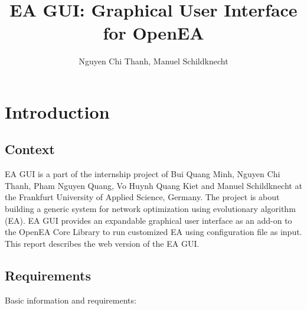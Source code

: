 \documentclass[11pt,a4paper]{article}
\author{Nguyen Chi Thanh, Manuel Schildknecht}
\title{EA GUI: Graphical User Interface for OpenEA}
\begin{document}
\maketitle

\section{Introduction}
\subsection{Context}
EA GUI is a part of the internship project of Bui Quang Minh, Nguyen Chi Thanh, Pham Nguyen Quang, Vo Huynh Quang Kiet and Manuel Schildknecht at the Frankfurt University of Applied Science, Germany. The project is about building a generic system for network optimization using evolutionary algorithm (EA). EA GUI provides an expandable graphical user interface as an add-on to the OpenEA Core Library to run customized EA using configuration file as input. This report describes the web version of the EA GUI.

\subsection{Requirements}
Basic information and requirements:
\end{document}
